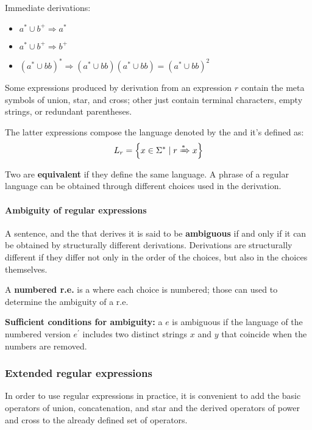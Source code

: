 \documentclass[english]{article}
\begin{document}
\bigskip
Immediate derivations:

\begin{itemize}
  \item \(a^\ast \cup b^+ \Rightarrow a^\ast\)
  \item \(a^\ast \cup b^+ \Rightarrow b^+\)
  \item \(\left(a^\ast \cup b b\right)^\ast \Rightarrow \left(a^\ast \cup bb\right) \left(a^\ast \cup bb\right) = \left(a^\ast \cup bb \right)^2\)
\end{itemize}

\bigskip
Some expressions produced by derivation from an expression \(r\) contain the meta symbols of union, star, and cross;
other just contain terminal characters, empty strings, or redundant parentheses.

The latter expressions compose the language denoted by the \re and it's defined as:
\[L_r = \left\{x \in \Sigma^\ast \mid r \xRightarrow{\ast} x \right\}\]

Two \re are \textbf{equivalent} if they define the same language.
A phrase of a regular language can be obtained through different choices used in the derivation.

\paragraph{Ambiguity of regular expressions}

A sentence, and the \re that derives it is said to be \textbf{ambiguous} if and only if it can be obtained by structurally different derivations.
Derivations are structurally different if they differ not only in the order of the choices, but also in the choices themselves.

\bigskip
A \textbf{numbered r.e.} is a \re where each choice is numbered;
those can used to determine the ambiguity of a r.e.

\textbf{Sufficient conditions for ambiguity:}
a \re \(e\) is ambiguous if the language of the numbered version \(e^\prime\) includes two distinct strings \(x\) and \(y\) that coincide when the numbers are removed.

\subsubsection{Extended regular expressions}

In order to use regular expressions in practice, it is convenient to add the basic operators of union, concatenation, and star and the derived operators of power and cross to the already defined set of operators.
\end{document}
